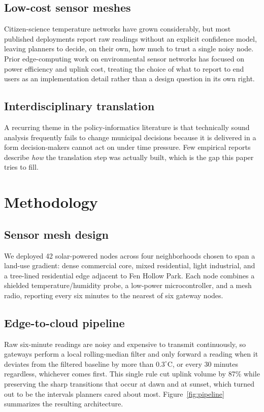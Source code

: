 \documentclass[10pt,twocolumn]{article}
\begin{document}
\subsection{Low-cost sensor meshes}
Citizen-science temperature networks have grown considerably, but most published deployments
report raw readings without an explicit confidence model, leaving planners to decide, on their
own, how much to trust a single noisy node. Prior edge-computing work on environmental sensor
networks has focused on power efficiency and uplink cost, treating the choice of what to report
to end users as an implementation detail rather than a design question in its own right.

\subsection{Interdisciplinary translation}
A recurring theme in the policy-informatics literature is that technically sound analysis
frequently fails to change municipal decisions because it is delivered in a form decision-makers
cannot act on under time pressure. Few empirical reports describe \emph{how} the translation
step was actually built, which is the gap this paper tries to fill.

\section{Methodology}

\subsection{Sensor mesh design}
We deployed 42 solar-powered nodes across four neighborhoods chosen to span a land-use gradient:
dense commercial core, mixed residential, light industrial, and a tree-lined residential edge
adjacent to Fen Hollow Park. Each node combines a shielded temperature/humidity probe, a
low-power microcontroller, and a mesh radio, reporting every six minutes to the nearest of six
gateway nodes.

\subsection{Edge-to-cloud pipeline}
Raw six-minute readings are noisy and expensive to transmit continuously, so gateways perform a
local rolling-median filter and only forward a reading when it deviates from the filtered
baseline by more than $0.3^\circ$C, or every 30 minutes regardless, whichever comes first. This
single rule cut uplink volume by 87\% while preserving the sharp transitions that occur at dawn
and at sunset, which turned out to be the intervals planners cared about most. Figure~\ref{fig:pipeline}
summarizes the resulting architecture.
\end{document}
